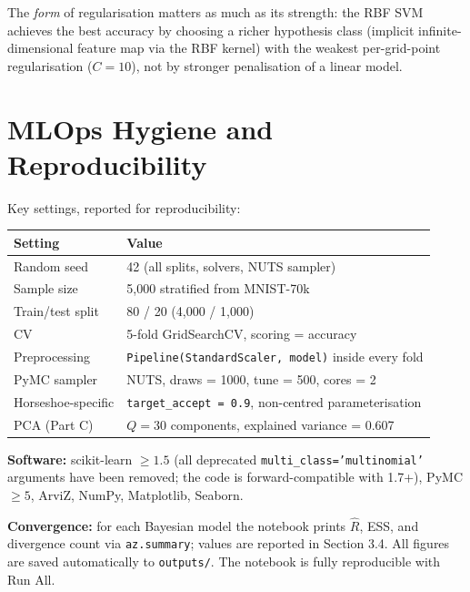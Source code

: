 \documentclass[10pt, letterpaper]{article}
\begin{document}
The \emph{form} of regularisation matters as much as its strength: the RBF SVM achieves the best accuracy by choosing a richer hypothesis class (implicit infinite-dimensional feature map via the RBF kernel) with the weakest per-grid-point regularisation ($C = 10$), not by stronger penalisation of a linear model.

\section{MLOps Hygiene and Reproducibility}

Key settings, reported for reproducibility:

\begin{center}\small
\renewcommand{\arraystretch}{1.15}
\begin{tabular}{@{}ll@{}}
\toprule
Setting & Value \\
\midrule
Random seed & 42 (all splits, solvers, NUTS sampler) \\
Sample size & 5{,}000 stratified from MNIST-70k \\
Train/test split & 80 / 20 (4{,}000 / 1{,}000) \\
CV & 5-fold GridSearchCV, scoring = accuracy \\
Preprocessing & \texttt{Pipeline(StandardScaler, model)} inside every fold \\
PyMC sampler & NUTS, draws = 1000, tune = 500, cores = 2 \\
Horseshoe-specific & \texttt{target\_accept = 0.9}, non-centred parameterisation \\
PCA (Part C) & $Q = 30$ components, explained variance = 0.607 \\
\bottomrule
\end{tabular}
\end{center}

\textbf{Software:} scikit-learn $\geq 1.5$ (all deprecated \texttt{multi\_class='multinomial'} arguments have been removed; the code is forward-compatible with 1.7+), PyMC $\geq 5$, ArviZ, NumPy, Matplotlib, Seaborn.

\textbf{Convergence:} for each Bayesian model the notebook prints $\hat{R}$, ESS, and divergence count via \texttt{az.summary}; values are reported in Section 3.4. All figures are saved automatically to \texttt{outputs/}. The notebook is fully reproducible with Run All.
\end{document}
